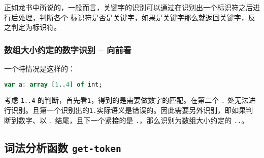 \documentclass[lang=cn]{elegantpaper}
\begin{document}
正如龙书中所说的，一般而言，关键字的识别可以通过在识别出一个标识符之后进行后处理，判断各个
标识符是否是关键字，如果是关键字那么就返回关键字，反之判定为标识符。

\subsubsection{数组大小约定的数字识别 -- 向前看}

一个特情况是这样的：

\begin{lstlisting}[language=pascal]
var a: array [1..4] of int;
\end{lstlisting}

考虑 \lstinline|1..4| 的判断，首先看\lstinline|1|，得到的是需要做数字的匹配。在第二个 \lstinline|.| 
处无法进行识别。且第一个识别出的\lstinline|1.|实际语义是错误的。因此需要另外识别，即如果判断到数字、以 
\lstinline|.| 结尾，且下一个紧接的是 \lstinline|.|，那么识别为数组大小约定的 \lstinline|..|。

\subsection{词法分析函数 \lstinline|get-token|}
\end{document}
